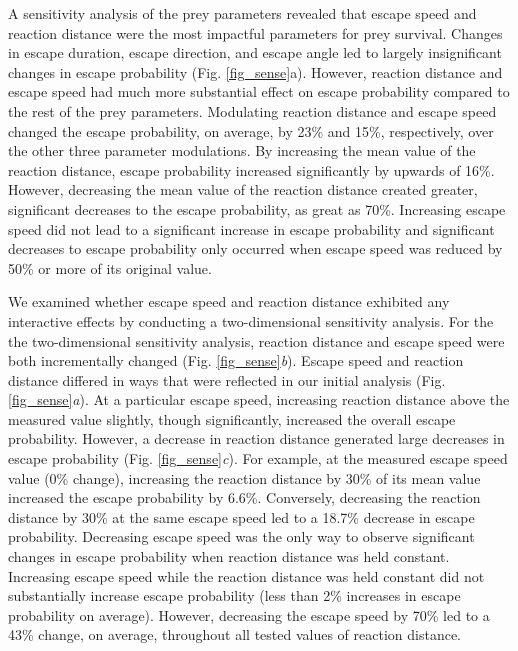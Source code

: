 \documentclass[]{rsos}%
\begin{document}
A sensitivity analysis of the prey parameters revealed that escape speed and reaction distance were the most impactful parameters for prey survival. 
Changes in escape duration, escape direction, and escape angle led to largely insignificant changes in escape probability (Fig. \ref{fig_sense}a). 
However, reaction distance and escape speed had much more substantial effect on escape probability compared to the rest of the prey parameters. 
Modulating reaction distance and escape speed changed the escape probability, on average, by 23\% and 15\%, respectively, over the other three parameter modulations.
By increasing the mean value of the reaction distance, escape probability increased significantly by upwards of 16\%. 
However, decreasing the mean value of the reaction distance created greater, significant decreases to the escape probability, as great as 70\%. 
Increasing escape speed did not lead to a significant increase in escape probability and significant decreases to escape probability only occurred when escape speed was reduced by 50\% or more of its original value.

We examined whether escape speed and reaction distance exhibited any interactive effects by conducting a two-dimensional sensitivity analysis.
For the the two-dimensional sensitivity analysis, reaction distance and escape speed were both incrementally changed (Fig. \ref{fig_sense}\textit{b}). 
Escape speed and reaction distance differed in ways that were reflected in our initial analysis (Fig. \ref{fig_sense}\textit{a}). 
At a particular escape speed, increasing reaction distance above the measured value slightly, though significantly, increased the overall escape probability. 
However, a decrease in reaction distance generated large decreases in escape probability (Fig. \ref{fig_sense}\textit{c}). 
For example, at the measured escape speed value (0\% change), increasing the reaction distance by 30\% of its mean value increased the escape probability by 6.6\%. 
Conversely, decreasing the reaction distance by 30\% at the same escape speed led to a 18.7\% decrease in escape probability.
Decreasing escape speed was the only way to observe significant changes in escape probability when reaction distance was held constant. 
Increasing escape speed while the reaction distance was held constant did not substantially increase escape probability (less than 2\% increases in escape probability on average).
However, decreasing the escape speed by 70\% led to a 43\% change, on average, throughout all tested values of reaction distance.
\end{document}
